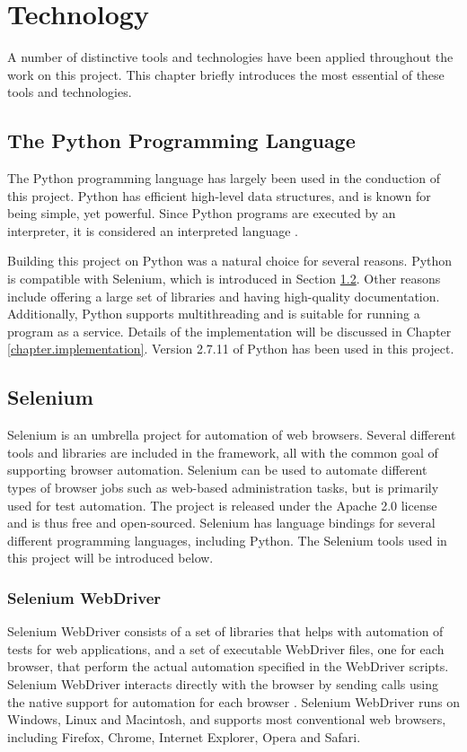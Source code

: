 \section{Technology}\label{chapter.technology}
\thispagestyle{plain}
A number of distinctive tools and technologies have been applied throughout the work on this project. This chapter briefly introduces the most essential of these tools and technologies.%

\subsection{The Python Programming Language}
The Python programming language has largely been used in the conduction of this project. Python has efficient high-level data structures, and is known for being simple, yet powerful. Since Python programs are executed by an interpreter, it is considered an interpreted language \cite{abyteofpython}.

Building this project on Python was a natural choice for several reasons. Python is compatible with Selenium, which is introduced in Section \ref{subsec.selenium}. Other reasons include offering a large set of libraries and having high-quality documentation. Additionally, Python supports multithreading and is suitable for running a program as a service. Details of the implementation will be discussed in Chapter \ref{chapter.implementation}. 
 Version 2.7.11 of Python has been used in this project.


\subsection{Selenium}\label{subsec.selenium}
Selenium is an umbrella project for automation of web browsers. Several different tools and libraries are included in the framework, all with the common goal of supporting browser automation. Selenium can be used to automate different types of browser jobs such as web-based administration tasks, but is primarily  used for test automation. The project is released under the Apache 2.0 license and is thus free and open-sourced. Selenium has language bindings for several different programming languages, including Python. The Selenium tools used in this project will be introduced below. %

\subsubsection{Selenium WebDriver}
Selenium WebDriver consists of a set of libraries that helps with automation of tests for web applications, and a set of executable WebDriver files, one for each browser, that perform the actual automation specified in the WebDriver scripts. Selenium WebDriver interacts directly with the browser by sending calls using the native support for automation for each browser \cite{selDocWebDriver}. Selenium WebDriver runs on Windows, Linux and Macintosh, and supports most conventional web browsers, including Firefox, Chrome, Internet Explorer, Opera and Safari.

